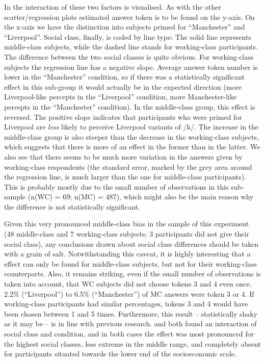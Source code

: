 In  the interaction of these two factors is visualised.
As with the other scatter/regression plots estimated answer token is to be found on the y-axis.
On the x-axis we have the distinction into subjects primed for ``Manchester'' and ``Liverpool''.
Social class, finally, is coded by line type: The solid line represents middle-class subjects, while the dashed line stands for working-class participants.
The difference between the two social classes is quite obvious.
For working-class subjects the regression line has a negative slope.
Average answer token number is lower in the ``Manchester'' condition, so if there was a statistically significant  effect in this sub-group it would actually be in the expected direction (more Liverpool-like percepts in the ``Liverpool'' condition, more Manchester-like percepts in the ``Manchester'' condition).
In the middle-class group, this effect is reversed.
The positive slope indicates that participants who were primed for Liverpool are \emph{less} likely to perceive Liverpool variants of /k/.
The increase in the middle-class group is also steeper than the decrease in the working-class subjects, which suggests that there is more of an effect in the former than in the latter.
We also see that there seems to be much more variation in the answers given by working-class respondents (the standard error, marked by the grey area around the regression line, is much larger than the one for middle-class participants).
This is probably mostly due to the small number of observations in this sub-sample (n(WC) = 69; n(MC) = 487), which might also be the main reason why the difference is not statistically significant.


\largerpage
Given this very pronounced middle-class bias in the sample of this experiment (48 middle-class and 7 working-class subjects; 3 participants did not give their social class), any conclusions drawn about social class differences should be taken with a grain of salt.
Notwithstanding this caveat, it is highly interesting that a  effect can only be found for middle-class subjects, but not for their working-class counterparts.
Also, it remains striking, even if the small number of observations is taken into account, that WC subjects did not choose tokens 3 and 4 even once.
2.2\% (``Liverpool'') to 6.5\% (``Manchester'') of MC answers were token 3 or 4.
If working-class participants had similar percentages, tokens 3 and 4 would have been chosen between 1 and 5 times.
Furthermore, this result -- statistically shaky as it may be -- is in line with previous research.
\textcite{hayetal2006a} and \textcite{haydrager2010} both found an interaction of social class and condition, and in both cases the  effect was most pronounced for the highest social classes, less extreme in the middle range, and completely absent for participants situated towards the lower end of the socioeconomic scale.


